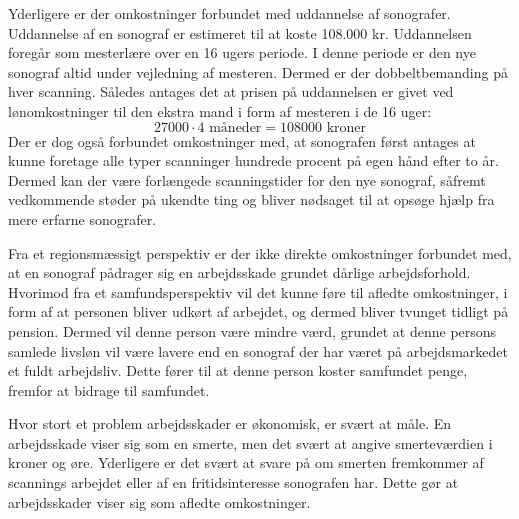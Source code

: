 Yderligere er der omkostninger forbundet med uddannelse af sonografer. Uddannelse af en sonograf er estimeret til at koste 108.000 kr. Uddannelsen foregår som mesterlære over en 16 ugers periode. I denne periode er den nye sonograf altid under vejledning af mesteren. Dermed er der dobbeltbemanding på hver scanning. Således antages det at prisen på uddannelsen er givet ved lønomkostninger til den ekstra mand i form af mesteren i de 16 uger:
\begin{equation}
27000\cdot4 \text{ måneder} = 108000 \text{ kroner}
\end{equation}
Der er dog også forbundet omkostninger med, at sonografen først antages at kunne foretage alle typer scanninger hundrede procent på egen hånd efter to år. Dermed kan der være forlængede scanningstider for den nye sonograf, såfremt vedkommende støder på ukendte ting og bliver nødsaget til at opsøge hjælp fra mere erfarne sonografer. 

Fra et regionsmæssigt perspektiv er der ikke direkte omkostninger forbundet med, at en sonograf pådrager sig en arbejdsskade grundet dårlige arbejdsforhold. Hvorimod fra et samfundsperspektiv vil det kunne føre til afledte omkostninger, i form af at personen bliver udkørt af arbejdet, og dermed bliver tvunget tidligt på pension. Dermed vil denne person være mindre værd, grundet at denne persons samlede livsløn vil være lavere end en sonograf der har været på arbejdsmarkedet et fuldt arbejdsliv. Dette fører til at denne person koster samfundet penge, fremfor at bidrage til samfundet. 

Hvor stort et problem arbejdsskader er økonomisk, er svært at måle. En arbejdsskade viser sig som en smerte, men det svært at angive smerteværdien i kroner og øre. Yderligere er det svært at svare på om smerten fremkommer af scannings arbejdet eller af en fritidsinteresse sonografen har. Dette gør at arbejdsskader viser sig som afledte omkostninger.

